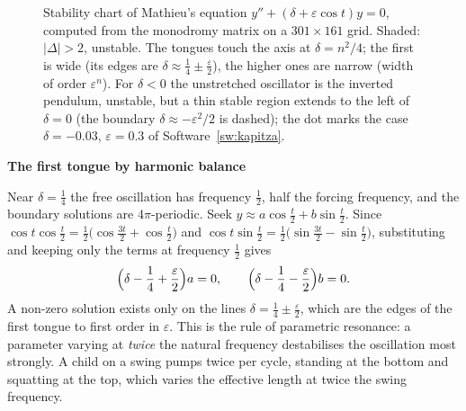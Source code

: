 \documentclass[11pt,a4paper]{article}
\numberwithin{equation}{section}
\theoremstyle{definition}
\newcommand{\subhead}[1]{%
  \par\medskip\noindent\textbf{#1}\par\nobreak\smallskip}
\begin{document}
\begin{figure}[H]
\caption{Stability chart of Mathieu's equation $y'' + (\delta + \varepsilon\cos t)y = 0$, computed from the monodromy matrix on a $301 \times 161$ grid. Shaded: $|\Delta| > 2$, unstable. The tongues touch the axis at
$\delta = n^2/4$; the first is wide (its edges are $\delta \approx \frac14 \pm \frac\varepsilon2$), the higher ones are narrow (width of order $\varepsilon^n$). For $\delta < 0$ the unstretched oscillator is the
inverted pendulum, unstable, but a thin stable region extends to the left of $\delta = 0$ (the boundary $\delta \approx -\varepsilon^2/2$ is dashed); the dot marks the case $\delta = -0.03$, $\varepsilon = 0.3$ of
Software~\ref{sw:kapitza}.}
\label{fig:mathieu}
\end{figure}

\subhead{The first tongue by harmonic balance}
Near $\delta = \frac14$ the free oscillation has frequency $\frac12$, half the forcing frequency, and the boundary solutions are $4\pi$-periodic. Seek $y \approx a\cos\frac t2 + b\sin\frac t2$. Since
$\cos t\cos\frac t2 = \frac12\bigl(\cos\frac{3t}2 + \cos\frac t2\bigr)$ and $\cos t\sin\frac t2 = \frac12\bigl(\sin\frac{3t}2 - \sin\frac t2\bigr)$, substituting and keeping only the terms at frequency $\frac12$ gives
\[
\Bigl(\delta - \frac14 + \frac\varepsilon2\Bigr)a = 0, \qquad \Bigl(\delta - \frac14 - \frac\varepsilon2\Bigr)b = 0 .
\]
A non-zero solution exists only on the lines $\delta = \frac14 \pm \frac\varepsilon2$, which are the edges of the first tongue to first order in $\varepsilon$. This is the rule of parametric resonance: a parameter
varying at \emph{twice} the natural frequency destabilises the oscillation most strongly. A child on a swing pumps twice per cycle, standing at the bottom and squatting at the top,
which varies the effective length at twice the swing frequency.
\end{document}
